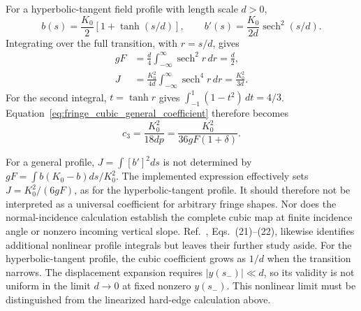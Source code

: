 For a hyperbolic-tangent field profile with length scale $d>0$,
\begin{equation}
 b(s)=\frac{K_0}{2}\left[1+\tanh(s/d)\right],\qquad
 b'(s)=\frac{K_0}{2d}\operatorname{sech}^2(s/d).
\end{equation}
Integrating over the full transition, with $r=s/d$, gives
\begin{align}
 gF&=\frac{d}{4}\int_{-\infty}^{\infty}\operatorname{sech}^2r\,dr
       =\frac d2,\\
 J&=\frac{K_0^2}{4d}\int_{-\infty}^{\infty}\operatorname{sech}^4r\,dr
       =\frac{K_0^2}{3d}.
\end{align}
For the second integral, $t=\tanh r$ gives
$\int_{-1}^{1}(1-t^2)\,dt=4/3$. Equation~\eqref{eq:fringe_cubic_general_coefficient}
therefore becomes
\begin{equation}
 c_3=\frac{K_0^2}{18dp}
     =\frac{K_0^2}{36gF(1+\delta)}.
\end{equation}

For a general profile, $J=\int[b']^2ds$ is not determined by
$gF=\int b(K_0-b)ds/K_0^2$. The implemented expression effectively sets
$J=K_0^2/(6gF)$, as for the hyperbolic-tangent profile. It should therefore
not be interpreted as a universal coefficient for arbitrary fringe shapes.
Nor does the normal-incidence calculation establish the complete cubic
map at finite incidence angle or nonzero incoming vertical slope.
Ref.~\cite{forest-fringe-1}, Eqs.~(21)--(22), likewise identifies additional
nonlinear profile integrals but leaves their further study aside.
For the hyperbolic-tangent profile, the cubic coefficient grows as $1/d$
when the transition narrows. The displacement expansion requires
$|y(s_-)|\ll d$, so its validity is not uniform in the limit $d\to0$ at fixed
nonzero $y(s_-)$. This nonlinear limit must be distinguished from the
linearized hard-edge calculation above.

